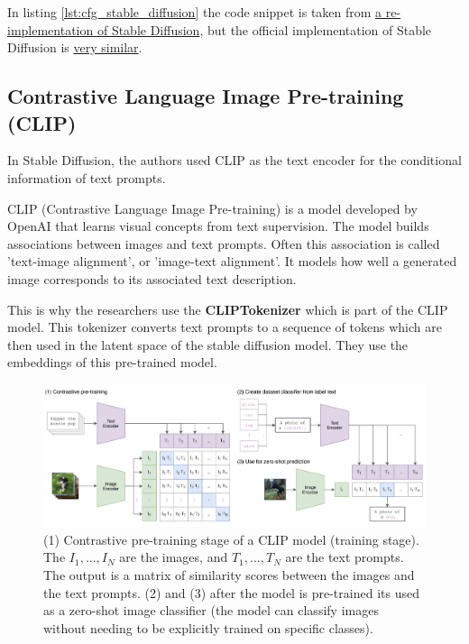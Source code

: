 In listing \ref{lst:cfg_stable_diffusion} the code snippet is taken from \href{https://github.com/hkproj/pytorch-stable-diffusion/blob/e0cb06de011787cdf13eed7b4287ad8410491149/sd/pipeline.py#L135C1-L136C1}{a re-implementation of Stable Diffusion}, but the official implementation of Stable Diffusion is \href{https://github.com/CompVis/stable-diffusion/blob/21f890f9da3cfbeaba8e2ac3c425ee9e998d5229/ldm/models/diffusion/ddim.py#L178C1-L179C1}{very similar}.

















\subsection{Contrastive Language Image Pre-training (CLIP)}

\label{subsec:clip}

In Stable Diffusion, the authors used CLIP as the text encoder for the conditional information of text prompts.

CLIP (Contrastive Language Image Pre-training) \cite{openai_clip} is a model developed by OpenAI that learns visual concepts from text supervision. The model builds associations between images and text prompts. Often this association is called 'text-image alignment', or 'image-text alignment'. It models how well a generated image corresponds to its associated text description.

This is why the researchers use the \textbf{CLIPTokenizer} which is part of the CLIP model. This tokenizer converts text prompts to a sequence of tokens which are then used in the latent space of the stable diffusion model. They use the embeddings of this pre-trained model.

\begin{figure}
    \centering
    \includegraphics[width=1\textwidth]{images/diffusion_models/stable_diffusion/clip.png}
    \caption{(1) Contrastive pre-training stage of a CLIP model \cite{openai_clip} (training stage). The $I_1, ..., I_N$ are the images, and $T_1, ..., T_N$ are the text prompts. The output is a matrix of similarity scores between the images and the text prompts. (2) and (3) after the model is pre-trained its used as a zero-shot image classifier (the model can classify images without needing to be explicitly trained on specific classes).}
    \label{fig:openai_clip}
\end{figure}

